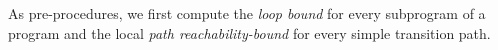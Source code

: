 
As pre-procedures, we first compute the \emph{loop bound} for every subprogram of a program and the local \emph{path reachability-bound} for every simple transition path.
